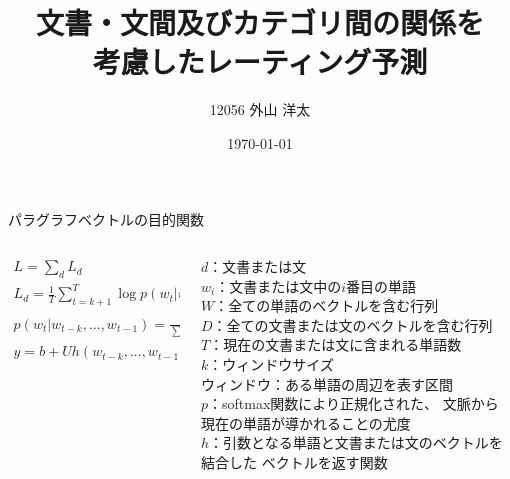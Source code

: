 \documentclass[unicode,10pt]{beamer}
\title{文書・文間及びカテゴリ間の関係を\\考慮したレーティング予測}
\institute{知能数理研究室}
\author{12056 外山 洋太}
\date{\today}
\newlength{\mycolumnwidth}
\begin{document}
\Large
{}

\begin{frame}{パラグラフベクトルの目的関数}{}
  \begin{columns}
    \begin{column}{\mycolumnwidth}
      \begin{gather*}
        L = \sum_d L_d \\
        L_d = \frac{1}{T} \sum^{T}_{t = k + 1}
              \log p(w_t | w_{t-k}, ..., w_{t-1}), \\
        p(w_t | w_{t-k}, ..., w_{t-1})
            = \frac{e^{y_{w_t}}}{\sum_{w'} e^{y_{w'}}}, \\
        y = b + Uh(w_{t-k}, ..., w_{t-1}, d; W, D)
      \end{gather*}
    \end{column}
    \begin{column}{\mycolumnwidth}
      $d$：文書または文 \\
      $w_i$：文書または文中の$i$番目の単語 \\
      $W$：全ての単語のベクトルを含む行列 \\
      $D$：全ての文書または文のベクトルを含む行列 \\
      $T$：現在の文書または文に含まれる単語数 \\
      $k$：ウィンドウサイズ \\
      ウィンドウ：ある単語の周辺を表す区間 \\
      $p$：softmax関数により正規化された、
           文脈から現在の単語が導かれることの尤度 \\
      $h$：引数となる単語と文書または文のベクトルを結合した
           ベクトルを返す関数 \\
    \end{column}
  \end{columns}
\end{frame}
\end{document}
